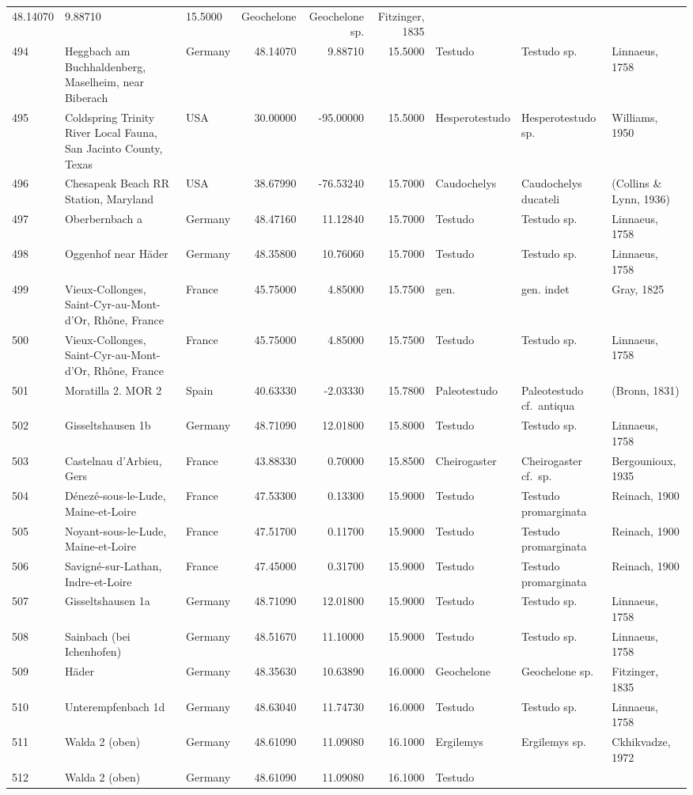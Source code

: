 \begin{landscape}
{\begin{longtable}[]{@{}lllrrrlll@{}}
48.14070 & 9.88710 & 15.5000 & Geochelone & Geochelone sp. & Fitzinger,
1835\tabularnewline
494 & Heggbach am Buchhaldenberg, Maselheim, near Biberach & Germany &
48.14070 & 9.88710 & 15.5000 & Testudo & Testudo sp. & Linnaeus,
1758\tabularnewline
495 & Coldspring Trinity River Local Fauna, San Jacinto County, Texas &
USA & 30.00000 & -95.00000 & 15.5000 & Hesperotestudo & Hesperotestudo
sp. & Williams, 1950\tabularnewline
496 & Chesapeak Beach RR Station, Maryland & USA & 38.67990 & -76.53240
& 15.7000 & Caudochelys & Caudochelys ducateli & (Collins \& Lynn,
1936)\tabularnewline
497 & Oberbernbach a & Germany & 48.47160 & 11.12840 & 15.7000 & Testudo
& Testudo sp. & Linnaeus, 1758\tabularnewline
498 & Oggenhof near Häder & Germany & 48.35800 & 10.76060 & 15.7000 &
Testudo & Testudo sp. & Linnaeus, 1758\tabularnewline
499 & Vieux-Collonges, Saint-Cyr-au-Mont-d'Or, Rhône, France & France &
45.75000 & 4.85000 & 15.7500 & gen. & gen. indet & Gray,
1825\tabularnewline
500 & Vieux-Collonges, Saint-Cyr-au-Mont-d'Or, Rhône, France & France &
45.75000 & 4.85000 & 15.7500 & Testudo & Testudo sp. & Linnaeus,
1758\tabularnewline
501 & Moratilla 2. MOR 2 & Spain & 40.63330 & -2.03330 & 15.7800 &
Paleotestudo & Paleotestudo cf.~antiqua & (Bronn, 1831)\tabularnewline
502 & Gisseltshausen 1b & Germany & 48.71090 & 12.01800 & 15.8000 &
Testudo & Testudo sp. & Linnaeus, 1758\tabularnewline
503 & Castelnau d'Arbieu, Gers & France & 43.88330 & 0.70000 & 15.8500 &
Cheirogaster & Cheirogaster cf.~sp. & Bergounioux, 1935\tabularnewline
504 & Dénezé-sous-le-Lude, Maine-et-Loire & France & 47.53300 & 0.13300
& 15.9000 & Testudo & Testudo promarginata & Reinach,
1900\tabularnewline
505 & Noyant-sous-le-Lude, Maine-et-Loire & France & 47.51700 & 0.11700
& 15.9000 & Testudo & Testudo promarginata & Reinach,
1900\tabularnewline
506 & Savigné-sur-Lathan, Indre-et-Loire & France & 47.45000 & 0.31700 &
15.9000 & Testudo & Testudo promarginata & Reinach, 1900\tabularnewline
507 & Gisseltshausen 1a & Germany & 48.71090 & 12.01800 & 15.9000 &
Testudo & Testudo sp. & Linnaeus, 1758\tabularnewline
508 & Sainbach (bei Ichenhofen) & Germany & 48.51670 & 11.10000 &
15.9000 & Testudo & Testudo sp. & Linnaeus, 1758\tabularnewline
509 & Häder & Germany & 48.35630 & 10.63890 & 16.0000 & Geochelone &
Geochelone sp. & Fitzinger, 1835\tabularnewline
510 & Unterempfenbach 1d & Germany & 48.63040 & 11.74730 & 16.0000 &
Testudo & Testudo sp. & Linnaeus, 1758\tabularnewline
511 & Walda 2 (oben) & Germany & 48.61090 & 11.09080 & 16.1000 &
Ergilemys & Ergilemys sp. & Ckhikvadze, 1972\tabularnewline
512 & Walda 2 (oben) & Germany & 48.61090 & 11.09080 & 16.1000 & Testudo

\end{longtable}}
\end{landscape}
